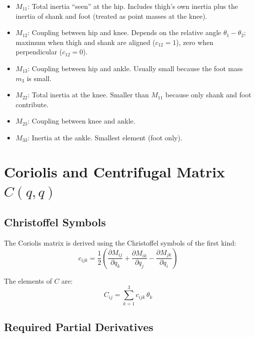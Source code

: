 \documentclass[11pt,a4paper]{article}
\newcommand{\vc}[1]{\bm{#1}}
\newcommand{\dt}[1]{\dot{#1}}
\newcommand{\pder}[2]{\frac{\partial #1}{\partial #2}}
\def\vc#1{#1}%
\def\dt#1{#1}%
\def\bm#1{#1}%
\begin{document}
\begin{itemize}
    \item $M_{11}$: Total inertia ``seen'' at the hip. Includes thigh's own inertia
          plus the inertia of shank and foot (treated as point masses at the knee).
    \item $M_{12}$: Coupling between hip and knee. Depends on the relative angle
          $\theta_1 - \theta_2$; maximum when thigh and shank are aligned ($c_{12} = 1$),
          zero when perpendicular ($c_{12} = 0$).
    \item $M_{13}$: Coupling between hip and ankle. Usually small because the foot
          mass $m_3$ is small.
    \item $M_{22}$: Total inertia at the knee. Smaller than $M_{11}$ because only
          shank and foot contribute.
    \item $M_{23}$: Coupling between knee and ankle.
    \item $M_{33}$: Inertia at the ankle. Smallest element (foot only).
\end{itemize}


\section{Coriolis and Centrifugal Matrix \texorpdfstring{$\vc{C}(\vc{q}, \dt{\vc{q}})$}{C(q, dq)}}

\subsection{Christoffel Symbols}

The Coriolis matrix is derived using the Christoffel symbols of the first kind:
\begin{equation}
    c_{ijk} = \frac{1}{2}\left(
        \pder{M_{ij}}{q_k} + \pder{M_{ik}}{q_j} - \pder{M_{jk}}{q_i}
    \right)
    \label{eq:christoffel}
\end{equation}

The elements of $\vc{C}$ are:
\begin{equation}
    C_{ij} = \sum_{k=1}^{3} c_{ijk} \, \dt{\theta}_k
    \label{eq:coriolis_def}
\end{equation}

\subsection{Required Partial Derivatives}
\end{document}
